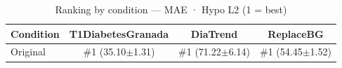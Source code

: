 \begin{table}[htbp]
\centering
\small
\caption{Ranking by condition — MAE · Hypo L2  (1 = best)}
\label{tab:ranking_mae_tbr_2_family_mechanism_baseline}
\begin{tabular}{lccc}
\toprule
\textbf{Condition} & \textbf{T1DiabetesGranada} & \textbf{DiaTrend} & \textbf{ReplaceBG} \\
\midrule
Original & \#1 (35.10$\pm$1.31) & \#1 (71.22$\pm$6.14) & \#1 (54.45$\pm$1.52) \\
\bottomrule
\end{tabular}
\end{table}